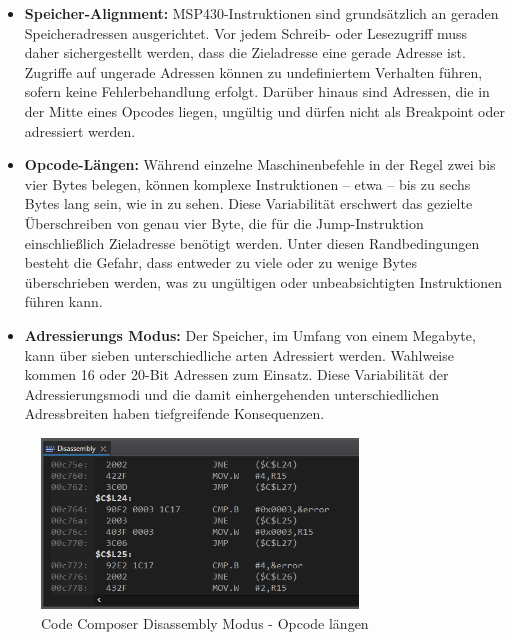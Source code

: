 \begin{itemize}
	\item \textbf{Speicher-Alignment:} MSP430-Instruktionen sind grunds\"atzlich an geraden Speicheradressen ausgerichtet. Vor jedem Schreib- oder Lesezugriff muss daher sichergestellt werden, dass die Zieladresse eine gerade Adresse ist. Zugriffe auf ungerade Adressen k\"onnen zu undefiniertem Verhalten f\"uhren, sofern keine Fehlerbehandlung erfolgt. Dar\"uber hinaus sind Adressen, die in der Mitte eines Opcodes liegen, ung\"ultig und d\"urfen nicht als Breakpoint oder adressiert werden.
	
	\item \textbf{Opcode-L\"angen:} W\"ahrend einzelne Maschinenbefehle in der Regel zwei bis vier Bytes belegen, k\"onnen komplexe Instruktionen – etwa  – bis zu sechs Bytes lang sein, wie in  zu sehen.  Diese Variabilit\"at erschwert das gezielte \"Uberschreiben von genau vier Byte, die f\"ur die Jump-Instruktion einschlie{\ss}lich Zieladresse ben\"otigt werden. Unter diesen Randbedingungen besteht die Gefahr, dass entweder zu viele oder zu wenige Bytes \"uberschrieben werden, was zu ung\"ultigen oder unbeabsichtigten Instruktionen f\"uhren kann.
	
	\item \textbf{Adressierungs Modus:} Der Speicher, im Umfang von einem Megabyte, kann \"uber sieben unterschiedliche arten Adressiert werden. Wahlweise kommen 16 oder 20-Bit Adressen zum Einsatz. Diese Variabilit\"at der Adressierungsmodi und die damit einhergehenden unterschiedlichen Adressbreiten haben tiefgreifende Konsequenzen.
\end{itemize}

\begin{figure}[h!]
	\centering
	\includegraphics[width=0.75\textwidth]{../Bilder/OpcodeLaengen.png}
	\caption{Code Composer Disassembly Modus - Opcode l\"angen}
	\label{fig:DisassemblyOpcodeLaengen}
\end{figure}

